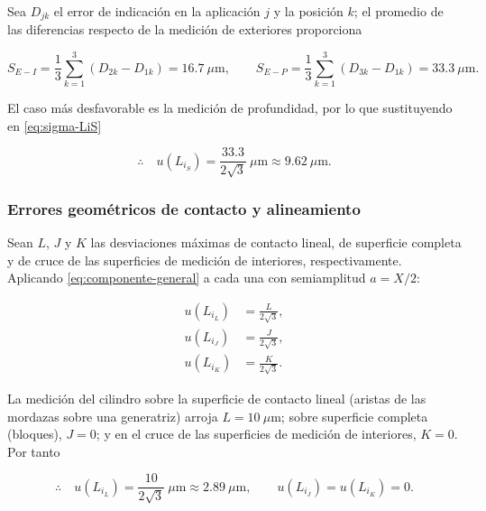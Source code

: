 

Sea $D_{jk}$ el error de indicación en la aplicación $j$ y la posición $k$; el
promedio de las diferencias respecto de la medición de exteriores proporciona

\begin{equation}
    S_{E-I} = \frac{1}{3}\sum_{k=1}^3 \left(D_{2k} - D_{1k}\right)
    = 16.7\ \mu\text{m},
    \qquad
    S_{E-P} = \frac{1}{3}\sum_{k=1}^3 \left(D_{3k} - D_{1k}\right)
    = 33.3\ \mu\text{m}.
    \label{eq:S-valor}
\end{equation}

El caso más desfavorable es la medición de profundidad, por lo que sustituyendo en
\eqref{eq:sigma-LiS}

\begin{equation}
    \therefore\quad u(L_{i_S}) =
    \frac{33.3}{2\sqrt{3}}\ \mu\text{m} \approx 9.62\ \mu\text{m}.
    \label{eq:sigma-LiS-valor}
\end{equation}

\subsubsection*{Errores geométricos de contacto y alineamiento}

Sean $L$, $J$ y $K$ las desviaciones máximas de contacto lineal, de superficie
completa y de cruce de las superficies de medición de interiores, respectivamente.
Aplicando \eqref{eq:componente-general} a cada una con semiamplitud $a = X/2$:

\begin{align}
    u(L_{i_L}) &= \frac{L}{2\sqrt{3}}, \label{eq:sigma-LiL} \\
    u(L_{i_J}) &= \frac{J}{2\sqrt{3}}, \label{eq:sigma-LiJ} \\
    u(L_{i_K}) &= \frac{K}{2\sqrt{3}}. \label{eq:sigma-LiK}
\end{align}

La medición del cilindro sobre la superficie de contacto lineal (aristas de las
mordazas sobre una generatriz) arroja $L = 10\ \mu\text{m}$; sobre superficie completa
(bloques), $J = 0$; y en el cruce de las superficies de medición de interiores,
$K = 0$. Por tanto

\begin{equation}
    \therefore\quad
    u(L_{i_L}) = \frac{10}{2\sqrt{3}}\ \mu\text{m} \approx 2.89\ \mu\text{m},
    \qquad u(L_{i_J}) = u(L_{i_K}) = 0 .
    \label{eq:sigma-LiLJK-valor}
\end{equation}

